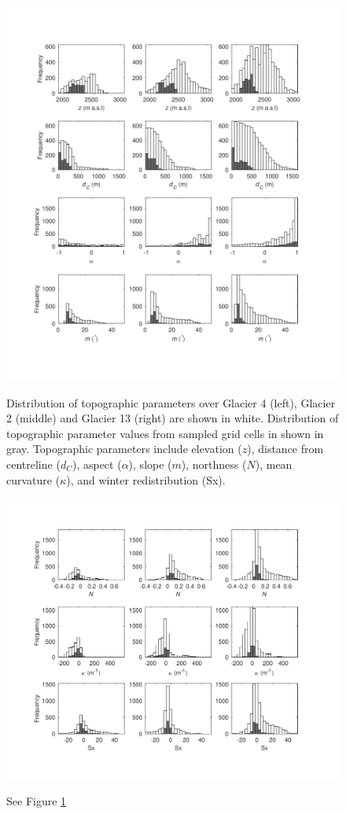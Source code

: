 \documentclass[review,oneside, letterpaper]{igs}
\begin{document}
\begin{figure}
	\centering
	\includegraphics[width =\textwidth]{TopoParamsSampled1.pdf}\\
	\caption{Distribution of topographic parameters over Glacier 4 (left), Glacier 2 (middle) and Glacier 13 (right) are shown in white. Distribution of topographic parameter values from sampled grid cells in shown in gray. Topographic parameters include elevation ($z$), distance from centreline ($d_C$), aspect ($\alpha$), slope ($m$), northness ($N$), mean curvature ($\kappa$), and winter redistribution (Sx).}
	\label{fig:TopoParamsSampled1}
\end{figure}
\begin{figure}
	\centering
	\includegraphics[width =\textwidth]{TopoParamsSampled2.pdf}\\
	\caption{See Figure \ref{fig:TopoParamsSampled1}}
	\label{fig:TopoParamsSampled2}
\end{figure}
\end{document}
